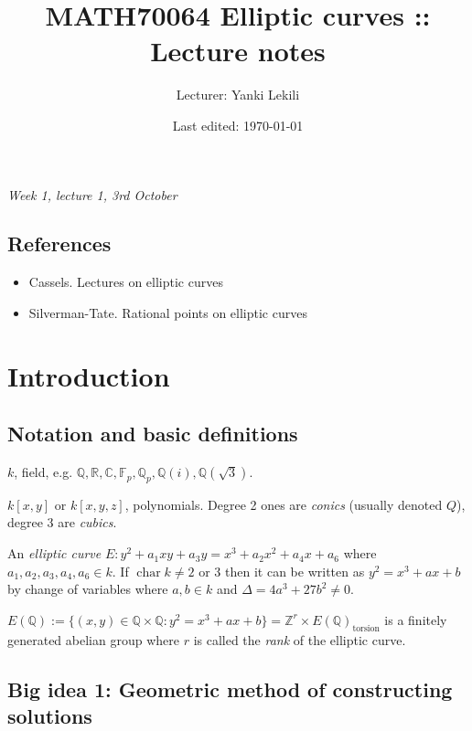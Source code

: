 \documentclass{article}
\title{MATH70064 Elliptic curves :: Lecture notes}
\author{Lecturer: Yanki Lekili}
\date{Last edited: \today}
\newcommand{\F}{\mathbb{F}}
\newcommand{\Z}{\mathbb{Z}}
\newcommand{\Q}{\mathbb{Q}}
\newcommand{\R}{\mathbb{R}}
\newcommand{\C}{\mathbb{C}}
\newcommand{\Char}{\operatorname{char}}
\theoremstyle{definition}
\begin{document}
\maketitle
\thispagestyle{empty}

\tableofcontents
\thispagestyle{empty}
\newpage
\setcounter{page}{1}

\begin{flushright}
\textit{Week 1, lecture 1, 3rd October}
\end{flushright}

\subsection*{References}
\begin{itemize}
\item Cassels. Lectures on elliptic curves
\item Silverman-Tate. Rational points on elliptic curves
\end{itemize}

\section{Introduction}
\subsection{Notation and basic definitions}
$k$, field, e.g. $\Q, \R, \C, \F_p, \Q_p, \Q(i), \Q(\sqrt 3)$.

$k[x,y]$ or $k[x,y,z]$, polynomials. Degree 2 ones are \textit{conics} (usually denoted $Q$), degree 3 are \textit{cubics}.

An \textit{elliptic curve} $E: y^2+a_1xy+a_3y=x^3+a_2x^2+a_4x+a_6$ where $a_1,a_2,a_3,a_4,a_6\in k$. If $\Char k\neq 2$ or 3 then it can be written as $y^2=x^3+ax+b$ by change of variables where $a,b\in k$ and $\Delta=4a^3+27b^2\neq 0$.

$E(\Q):=\{(x,y)\in \Q\times \Q:y^2=x^3+ax+b\}=\Z^r\times E(\Q)_{\text{torsion}}$ is a finitely generated abelian group where $r$ is called the \textit{rank} of the elliptic curve.

\subsection{Big idea 1: Geometric method of constructing solutions}
\end{document}
